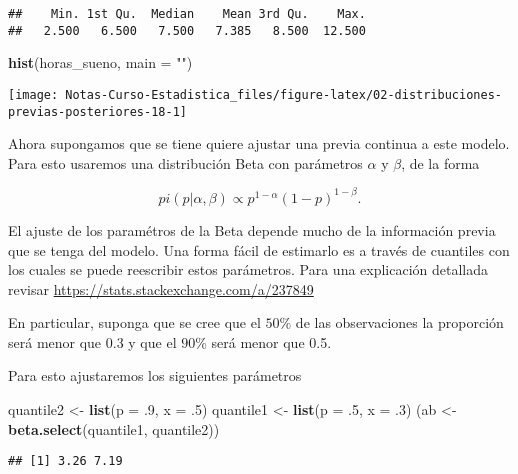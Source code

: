 \documentclass[
  12pt,
]{book}
\newenvironment{Shaded}{\begin{snugshade}}{\end{snugshade}}
\newcommand{\DataTypeTok}[1]{\textcolor[rgb]{0.13,0.29,0.53}{#1}}
\newcommand{\FloatTok}[1]{\textcolor[rgb]{0.00,0.00,0.81}{#1}}
\newcommand{\KeywordTok}[1]{\textcolor[rgb]{0.13,0.29,0.53}{\textbf{#1}}}
\newcommand{\NormalTok}[1]{#1}
\newcommand{\StringTok}[1]{\textcolor[rgb]{0.31,0.60,0.02}{#1}}
\begin{document}
\begin{verbatim}
##    Min. 1st Qu.  Median    Mean 3rd Qu.    Max. 
##   2.500   6.500   7.500   7.385   8.500  12.500
\end{verbatim}

\begin{Shaded}
\begin{Highlighting}[]
\KeywordTok{hist}\NormalTok{(horas\_sueno, }\DataTypeTok{main =} \StringTok{""}\NormalTok{)}
\end{Highlighting}
\end{Shaded}

\begin{center}\texttt{[image: Notas-Curso-Estadistica\_files/figure-latex/02-distribuciones-previas-posteriores-18-1]} \end{center}

Ahora supongamos que se tiene quiere ajustar una previa continua a este modelo. Para esto usaremos una distribución Beta con parámetros \(\alpha\) y \(\beta\), de la forma

\[
pi(p\vert \alpha, \beta) \propto p^{1-\alpha} (1-p)^{1-\beta}.
\]

El ajuste de los paramétros de la Beta depende mucho de la información previa que se tenga del modelo. Una forma fácil de estimarlo es a través de cuantiles con los cuales se puede reescribir estos parámetros. Para una explicación detallada revisar \url{https://stats.stackexchange.com/a/237849}

En particular, suponga que se cree que el \(50\%\) de las observaciones la proporción será menor que 0.3 y que el \(90\%\) será menor que 0.5.

Para esto ajustaremos los siguientes parámetros

\begin{Shaded}
\begin{Highlighting}[]
\NormalTok{quantile2 \textless{}{-}}\StringTok{ }\KeywordTok{list}\NormalTok{(}\DataTypeTok{p =} \FloatTok{.9}\NormalTok{, }\DataTypeTok{x =} \FloatTok{.5}\NormalTok{)}
\NormalTok{quantile1 \textless{}{-}}\StringTok{ }\KeywordTok{list}\NormalTok{(}\DataTypeTok{p =} \FloatTok{.5}\NormalTok{, }\DataTypeTok{x =} \FloatTok{.3}\NormalTok{)}
\NormalTok{(ab \textless{}{-}}\StringTok{ }\KeywordTok{beta.select}\NormalTok{(quantile1, quantile2))}
\end{Highlighting}
\end{Shaded}

\begin{verbatim}
## [1] 3.26 7.19
\end{verbatim}
\end{document}
